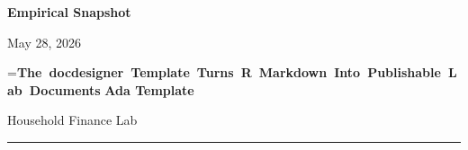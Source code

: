 \documentclass[12pt]{article}
\newif\ifdocdesigneranon
\begin{document}
\noindent
\begin{minipage}[t]{\textwidth}
\vspace{0pt}
{\small\sffamily\bfseries\color{docdesigneraccent}Empirical Snapshot}\hfill
\ifdocdesigneranon\else
{\small May 28, 2026}%
\fi
\par\vspace{0.35em}

\begingroup
{}=\hbox{\large\bfseries The docdesigner Template Turns R Markdown Into
Publishable Lab Documents}%
\ifdim\wd0>\linewidth
  \noindent\resizebox{\linewidth}{!}{\large\bfseries The docdesigner Template
Turns R Markdown Into Publishable Lab Documents}\par
\else
  {\large\bfseries The docdesigner Template Turns R Markdown Into Publishable
Lab Documents\par}%
\fi
\endgroup
\vspace{0.3em}
{\scriptsize\bfseries
Ada Template%
}\par
{\scriptsize Household Finance Lab}\par
\end{minipage}\hfill
\par

\vspace{0.55em}
\noindent\textcolor{docdesignerrule}{\rule{\textwidth}{0.7pt}}\par
\vspace{0.55em}
\end{document}
